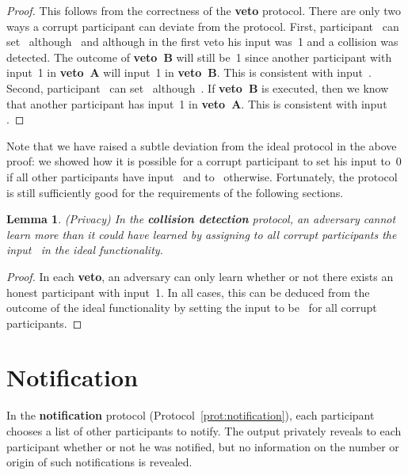 \documentclass[11pt]{article}
\newtheorem{lemma}[theorem]{Lemma}
\begin{document}
\begin{proof}
This follows from the correctness of the \textbf{veto} protocol.
There are only two ways a corrupt participant can deviate from the
protocol. First, participant~ can set~ although~ and although in the first veto his input was~1 and a
collision was detected. The outcome of \textbf{veto~B} will still
be~1 since another participant with input~1 in \textbf{veto~A} will
input~1 in \textbf{veto~B}. This is consistent with input~.
Second, participant~ can set~ although~. If
\textbf{veto~B} is executed, then we know that another participant
has input~1 in \textbf{veto~A}.
 This is  consistent with input . \end{proof}

Note that we have raised a subtle deviation from the ideal protocol
in the above proof:   we showed how it is possible for a corrupt
participant to set his input to~0 if all other participants have
input~ and to~ otherwise. Fortunately, the protocol is still
sufficiently good for the requirements of the following sections.


\begin{lemma}(Privacy)
In the \textbf{collision detection}  protocol, an adversary cannot
learn more than it could have learned by assigning to all corrupt
participants the input~ in the ideal functionality.
\end{lemma}

\begin{proof}
In each \textbf{veto}, an adversary  can only learn whether or not
there exists an honest participant with input~1. In all cases, this
can be deduced from the outcome of the ideal functionality by
setting the input to be~ for all corrupt participants.
\end{proof}


\section{Notification}
\label{sec:notification}

In the \textbf{notification} protocol
(Protocol~\ref{prot:notification}), each participant chooses a list
of other participants to notify. The output privately reveals to
each participant whether or not he was notified, but no information
on the number or origin of such notifications is revealed.
\end{document}
